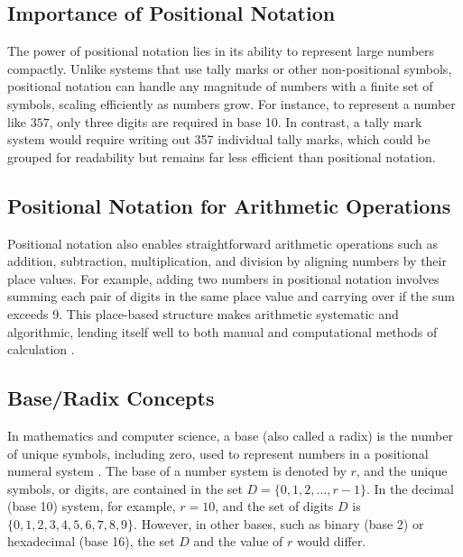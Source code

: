 \subsection{Importance of Positional Notation}
The power of positional notation lies in its ability to represent large numbers compactly. Unlike systems that use tally marks or other non-positional symbols, positional notation can handle any magnitude of numbers with a finite set of symbols, scaling efficiently as numbers grow. For instance, to represent a number like \( 357 \), only three digits are required in base 10. In contrast, a tally mark system would require writing out 357 individual tally marks, which could be grouped for readability but remains far less efficient than positional notation.

\subsection{Positional Notation for Arithmetic Operations}
Positional notation also enables straightforward arithmetic operations such as addition, subtraction, multiplication, and division by aligning numbers by their place values. For example, adding two numbers in positional notation involves summing each pair of digits in the same place value and carrying over if the sum exceeds 9. This place-based structure makes arithmetic systematic and algorithmic, lending itself well to both manual and computational methods of calculation \cite{burton2010-number}.


\subsection{Base/Radix Concepts}
In mathematics and computer science, a base (also called a radix) is the number of unique symbols, including zero, used to represent numbers in a positional numeral system \cite{knuth1997,rosen2018}. The base of a number system is denoted by \( r \), and the unique symbols, or digits, are contained in the set \( D = \{0, 1, 2, \ldots, r-1\} \). In the decimal (base 10) system, for example, \( r = 10 \), and the set of digits \( D \) is \( \{0, 1, 2, 3, 4, 5, 6, 7, 8, 9\} \). However, in other bases, such as binary (base 2) or hexadecimal (base 16), the set \( D \) and the value of \( r \) would differ.

